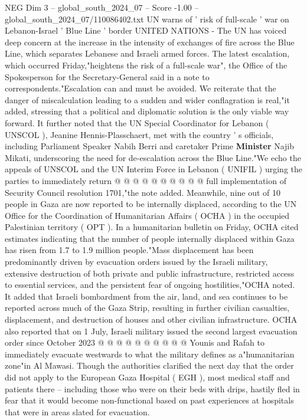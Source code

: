 \begin{textsample}{NEG Dim 3 – global\_south\_2024\_07 – Score -1.00 – global\_south\_2024\_07/110086402.txt}  \label{ex:f3_neg_150}
UN warns of ' risk of full-scale ' war on Lebanon-Israel ' Blue Line ' border UNITED NATIONS - The UN has voiced deep concern at the increase in the intensity of exchanges of fire across the Blue Line, which separates Lebanese and Israeli armed forces.
The latest escalation, which occurred Friday,"heightens the risk of a full-scale war", the Office of the Spokesperson for the Secretary-General said in a note to correspondents."Escalation can and must be avoided.
We reiterate that the danger of miscalculation leading to a sudden and wider conflagration is real,"it added, stressing that a political and diplomatic solution is the only viable way forward.
It further noted that the UN Special Coordinator for Lebanon ( UNSCOL ), Jeanine Hennis-Plasschaert, met with the country ' s officials, including Parliament Speaker Nabih Berri and caretaker Prime \textbf{Minister} Najib Mikati, underscoring the need for de-escalation across the Blue Line."We echo the appeals of UNSCOL and the UN Interim Force in Lebanon ( UNIFIL ) urging the parties to immediately return @ @ @ @ @ @ @ @ @ @ full implementation of Security Council resolution 1701,"the note added.
Meanwhile, nine out of 10 people in Gaza are now reported to be internally displaced, according to the UN Office for the Coordination of Humanitarian Affairs ( OCHA ) in the occupied Palestinian territory ( OPT ).
In a humanitarian bulletin on Friday, OCHA cited estimates indicating that the number of people internally displaced within Gaza has risen from 1.7 to 1.9 million people."Mass displacement has been predominantly driven by evacuation orders issued by the Israeli military, extensive destruction of both private and public infrastructure, restricted access to essential services, and the persistent fear of ongoing hostilities,"OCHA noted.
It added that Israeli bombardment from the air, land, and sea continues to be reported across much of the Gaza Strip, resulting in further civilian casualties, displacement, and destruction of houses and other civilian infrastructure.
OCHA also reported that on 1 July, Israeli military issued the second largest evacuation order since October 2023 @ @ @ @ @ @ @ @ @ @ Younis and Rafah to immediately evacuate westwards to what the military defines as a"humanitarian zone"in Al Mawasi.
Though the authorities clarified the next day that the order did not apply to the European Gaza Hospital ( EGH ), most medical staff and patients there -- including those who were on their beds with drips, hastily fled in fear that it would become non-functional based on past experiences at hospitals that were in areas slated for evacuation.

\end{textsample}
